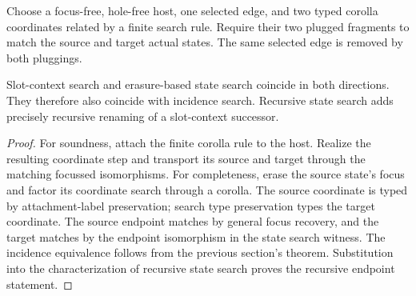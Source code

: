 \begin{definition}\label{term:slot-context-search}
Choose a focus-free, hole-free host, one selected edge, and two typed corolla
coordinates related by a finite search rule. Require their two plugged
fragments to match the source and target actual states. The same selected
edge is removed by both pluggings.
\end{definition}
\begin{theorem}
Slot-context search and erasure-based state search coincide in both directions.
They therefore also coincide with incidence search. Recursive state search
adds precisely recursive renaming of a slot-context successor.
\end{theorem}
\begin{proof}
For soundness, attach the finite corolla rule to the host. Realize the resulting
coordinate step and transport its source and target through the matching
focussed isomorphisms. For completeness, erase the source state's focus and
factor its coordinate search through a corolla. The source coordinate is
typed by attachment-label preservation; search type preservation types the
target coordinate. The source endpoint matches by general focus recovery,
and the target matches by the endpoint isomorphism in the state search witness.
The incidence equivalence follows from the previous section's theorem.
Substitution into the characterization of recursive state search proves the
recursive endpoint statement.
\end{proof}

